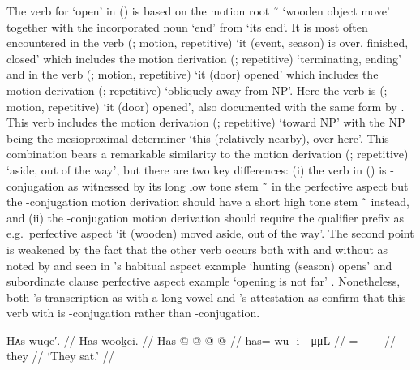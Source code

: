 The verb for ‘open’ in (\lastx) is based on the motion root  \~\  ‘wooden object move’ together with the incorporated noun  ‘end’ from  ‘its end’.
It is most often encountered in the verb  (; motion,  repetitive) ‘it (event, season) is over, finished, closed’ which includes the motion derivation  (;  repetitive) ‘terminating, ending’
and in the verb  (; motion,  repetitive) ‘it (door) opened’ which includes the motion derivation  (;  repetitive) ‘obliquely away from NP’.
Here the verb is  (; motion,  repetitive) ‘it (door) opened’, also documented with the same form by \textcite[796]{leer:1976}.
This verb includes the motion derivation  (;  repetitive) ‘toward NP’ with the NP being the mesioproximal determiner  ‘this (relatively nearby), over here’.
This combination bears a remarkable similarity to the motion derivation  (;  repetitive) ‘aside, out of the way’, but there are two key differences:
(i) the verb in (\lastx) is -conjugation as witnessed by its long low tone stem  \~\  in the perfective aspect but the -conjugation motion derivation should have a short high tone stem  \~\  instead,
and (ii) the -conjugation motion derivation should require the  qualifier prefix as e.g.\ perfective aspect  ‘it (wooden) moved aside, out of the way’.
The second point is weakened by the fact that the other verb  occurs both with and without  as noted by \textcite{eggleston:2017} and seen in \citeauthor{story-naish:1973}’s habitual aspect example  ‘hunting (season) opens’ and subordinate clause perfective aspect example  ‘opening is not far’ \parencite[142.1921–1922]{story-naish:1973}.
Nonetheless, both \citeauthor{swanton:1909}’s transcription as  with a long vowel and \citeauthor{leer:1976}’s attestation as  confirm that this verb with  is -conjugation rather than -conjugation. 

\ex\label{ex:92-72-they-sat}%
%
\begingl
	\glpreamble	Hᴀs wuqe′. //
	\glpreamble	Has wooḵei. //
	\gla	Has @  @ {} @ {} @ {} //
	\glb	has= wu- i-  -μμL //
	\glc	{}= - -  - //
	\gld	they  {} {} {} //
	\glft	‘They sat.’
		//
\endgl
\xe

